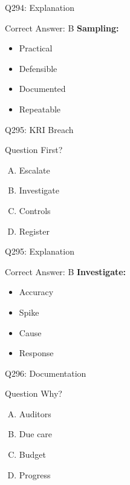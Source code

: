 \documentclass{beamer}
\begin{document}
	\begin{frame}{Q294: Explanation}
		\begin{block}{Correct Answer: B}
			\textbf{Sampling:}
			\begin{itemize}
				\item Practical
				\item Defensible
				\item Documented
				\item Repeatable
			\end{itemize}
		\end{block}
	\end{frame}
	
	\begin{frame}{Q295: KRI Breach}
		\begin{block}{Question}
			First?
		\end{block}
		\begin{enumerate}[(A)]
			\item Escalate
			\item Investigate
			\item Controls
			\item Register
		\end{enumerate}
	\end{frame}
	
	\begin{frame}{Q295: Explanation}
		\begin{block}{Correct Answer: B}
			\textbf{Investigate:}
			\begin{itemize}
				\item Accuracy
				\item Spike
				\item Cause
				\item Response
			\end{itemize}
		\end{block}
	\end{frame}
	
	\begin{frame}{Q296: Documentation}
		\begin{block}{Question}
			Why?
		\end{block}
		\begin{enumerate}[(A)]
			\item Auditors
			\item Due care
			\item Budget
			\item Progress
		\end{enumerate}
	\end{frame}
	
\end{document}
